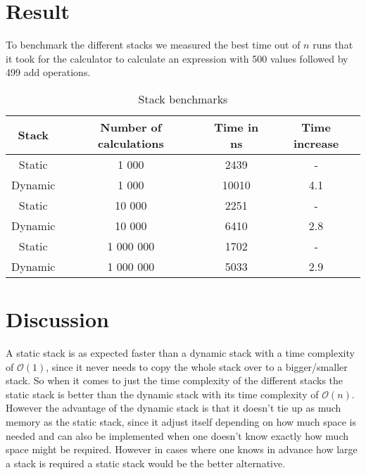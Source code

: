 \documentclass[a4paper,11pt]{article}
\begin{document}
\section*{Result}
To benchmark the different stacks we measured the best time out of $n$ runs that it took for the calculator to
calculate an expression with 500 values followed by 499 add operations.
\begin{table}[h]
  \begin{center}
    \begin{tabular}{|c|c|c|c|}
      \hline
      \textbf{Stack} & \textbf{Number of calculations} & \textbf{Time in ns} & \textbf{Time increase} \\
      \hline
      Static         & 1 000                           & 2439                & -                      \\
      Dynamic        & 1 000                           & 10010               & 4.1                    \\
      \hline
      Static         & 10 000                          & 2251                & -                      \\
      Dynamic        & 10 000                          & 6410                & 2.8                    \\
      \hline
      Static         & 1 000 000                       & 1702                & -                      \\
      Dynamic        & 1 000 000                       & 5033                & 2.9                    \\
      \hline
    \end{tabular}
    \caption{Stack benchmarks}
    \label{tab:task1}
  \end{center}
\end{table}


\section*{Discussion}

A static stack is as expected faster than a dynamic stack with a time complexity of
$\mathcal{O}(1)$, since it never needs to copy the whole stack over to a bigger/smaller
stack. So when it comes to just the time complexity of the different stacks the static
stack is better than the dynamic stack with its time complexity of $\mathcal{O}(n)$.
However the advantage of the dynamic stack is that it doesn't tie up as much memory as the
static stack, since it adjust itself depending on how much space is needed and can also be
implemented when one doesn't know exactly how much space might be required. However in cases
where one knows in advance how large a stack is required a static stack would be the better
alternative.
\end{document}
